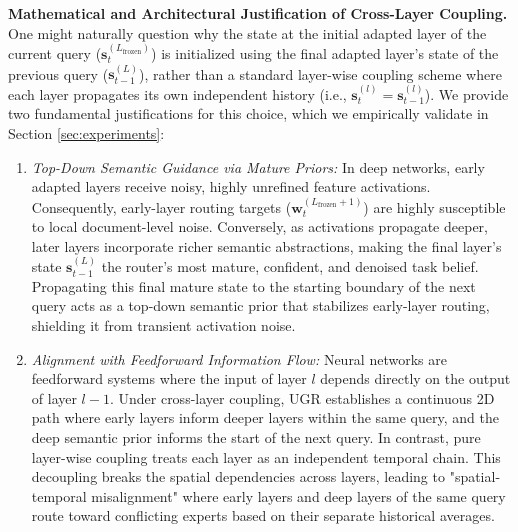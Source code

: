 \textbf{Mathematical and Architectural Justification of Cross-Layer Coupling.} 
One might naturally question why the state at the initial adapted layer of the current query ($\mathbf{s}_t^{(L_{\text{frozen}})}$) is initialized using the final adapted layer's state of the previous query ($\mathbf{s}_{t-1}^{(L)}$), rather than a standard layer-wise coupling scheme where each layer propagates its own independent history (i.e., $\mathbf{s}_t^{(l)} = \mathbf{s}_{t-1}^{(l)}$). We provide two fundamental justifications for this choice, which we empirically validate in Section \ref{sec:experiments}:
\begin{enumerate}
    \item \emph{Top-Down Semantic Guidance via Mature Priors:} In deep networks, early adapted layers receive noisy, highly unrefined feature activations. Consequently, early-layer routing targets ($\mathbf{w}_t^{(L_{\text{frozen}}+1)}$) are highly susceptible to local document-level noise. Conversely, as activations propagate deeper, later layers incorporate richer semantic abstractions, making the final layer's state $\mathbf{s}_{t-1}^{(L)}$ the router's most mature, confident, and denoised task belief. Propagating this final mature state to the starting boundary of the next query acts as a top-down semantic prior that stabilizes early-layer routing, shielding it from transient activation noise.
    \item \emph{Alignment with Feedforward Information Flow:} Neural networks are feedforward systems where the input of layer $l$ depends directly on the output of layer $l-1$. Under cross-layer coupling, UGR establishes a continuous 2D path where early layers inform deeper layers within the same query, and the deep semantic prior informs the start of the next query. In contrast, pure layer-wise coupling treats each layer as an independent temporal chain. This decoupling breaks the spatial dependencies across layers, leading to "spatial-temporal misalignment" where early layers and deep layers of the same query route toward conflicting experts based on their separate historical averages.
\end{enumerate}

